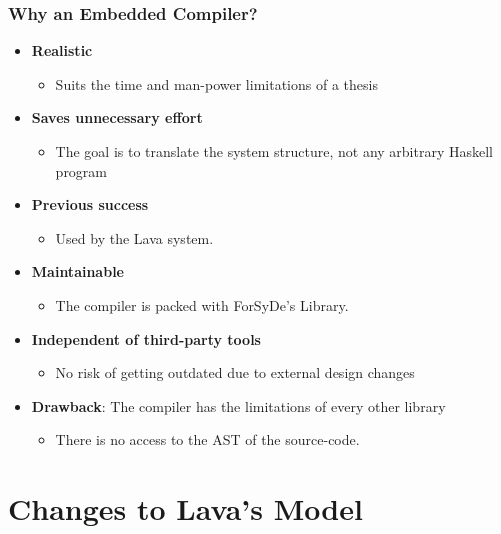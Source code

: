 \documentclass{beamer}
\begin{document}
\begin{frame}
  \frametitle{Why an Embedded Compiler?}
  \begin{itemize}
    \item \textbf{Realistic}
      \begin{itemize}
        \item Suits the time and man-power limitations of a thesis
      \end{itemize}
      \pause
    \item \textbf{Saves unnecessary effort}
      \begin{itemize}
      \item The goal is to translate the system structure, not 
        any arbitrary Haskell program
      \end{itemize}
      \pause
    \item \textbf{Previous success} 
      \begin{itemize}
        \item Used by the Lava system.
      \end{itemize}
      \pause
    \item \textbf{Maintainable}
      \begin{itemize}
        \item The compiler is packed with ForSyDe's Library.
      \end{itemize}
      \pause
    \item \textbf{Independent of third-party tools}
      \begin{itemize}
        \item No risk of getting outdated due to external design changes
      \end{itemize}
      \pause
    \item \textbf{Drawback}: The compiler has the limitations of every
      other library
      \begin{itemize}
      \item There is no access to the AST of the source-code.
      \end{itemize}

    \end{itemize}
\end{frame}


\section{Changes to Lava's Model}
\end{document}

